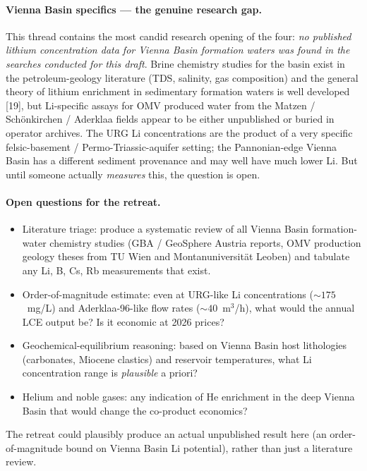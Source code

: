 \documentclass{article}
\begin{document}
\paragraph{Vienna Basin specifics --- the genuine research gap.}
This thread contains the most candid research opening of the four:
\emph{no published lithium concentration data for Vienna Basin formation
waters was found in the searches conducted for this draft}. Brine
chemistry studies for the basin exist in the petroleum-geology
literature (TDS, salinity, gas composition) and the general theory of
lithium enrichment in sedimentary formation waters is well developed
[19], but Li-specific assays for OMV produced
water from the Matzen / Sch\"onkirchen / Aderklaa fields appear to
be either unpublished or buried in operator archives. The URG Li
concentrations are the product of a very specific
felsic-basement / Permo-Triassic-aquifer setting; the Pannonian-edge
Vienna Basin has a different sediment provenance and may well have
much lower Li. But until someone actually \emph{measures} this, the
question is open.

\paragraph{Open questions for the retreat.}
\begin{itemize}
\item Literature triage: produce a systematic review of all Vienna Basin
formation-water chemistry studies (GBA / GeoSphere Austria reports,
OMV production geology theses from TU Wien and Montanuniversit\"at
Leoben) and tabulate any Li, B, Cs, Rb measurements that exist.
\item Order-of-magnitude estimate: even at URG-like Li concentrations
($\sim 175$~mg/L) and Aderklaa-96-like flow rates ($\sim 40$~m$^3$/h),
what would the annual LCE output be? Is it economic at 2026 prices?
\item Geochemical-equilibrium reasoning: based on Vienna Basin host
lithologies (carbonates, Miocene clastics) and reservoir temperatures,
what Li concentration range is \emph{plausible} a priori?
\item Helium and noble gases: any indication of He enrichment in the
deep Vienna Basin that would change the co-product economics?
\end{itemize}

The retreat could plausibly produce an actual unpublished result here
(an order-of-magnitude bound on Vienna Basin Li potential), rather than
just a literature review.
\end{document}
